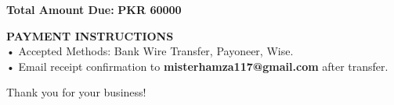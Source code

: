 \documentclass[11pt,a4paper]{article}
\begin{document}
\begin{flushright}
    {\Large \textbf{Total Amount Due:} \quad \textbf{PKR 60000}}
\end{flushright}

\vspace{3em}

\textbf{PAYMENT INSTRUCTIONS} \\[4pt]
• Accepted Methods: Bank Wire Transfer, Payoneer, Wise. \\
• Email receipt confirmation to \textbf{misterhamza117@gmail.com} after transfer.

\vfill
\begin{center}
    {\color{gray} Thank you for your business!}
\end{center}
\end{document}
